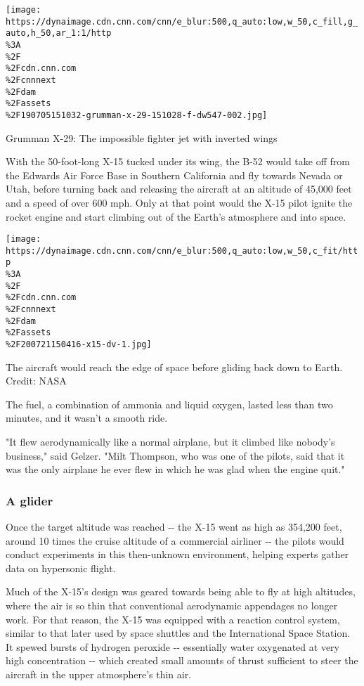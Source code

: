 \texttt{[image: https://dynaimage.cdn.cnn.com/cnn/e\_blur:500,q\_auto:low,w\_50,c\_fill,g\_auto,h\_50,ar\_1:1/http\\\%3A\\\%2F\\\%2Fcdn.cnn.com\\\%2Fcnnnext\\\%2Fdam\\\%2Fassets\\\%2F190705151032-grumman-x-29-151028-f-dw547-002.jpg]}

Grumman X-29: The impossible fighter jet with inverted wings

With the 50-foot-long X-15 tucked under its wing, the B-52 would take
off from the Edwards Air Force Base in Southern California and fly
towards Nevada or Utah, before turning back and releasing the aircraft
at an altitude of 45,000 feet and a speed of over 600 mph. Only at that
point would the X-15 pilot ignite the rocket engine and start climbing
out of the Earth's atmosphere and into space.

\texttt{[image: https://dynaimage.cdn.cnn.com/cnn/e\_blur:500,q\_auto:low,w\_50,c\_fit/http\\\%3A\\\%2F\\\%2Fcdn.cnn.com\\\%2Fcnnnext\\\%2Fdam\\\%2Fassets\\\%2F200721150416-x15-dv-1.jpg]}

The aircraft would reach the edge of space before gliding back down to
Earth. Credit: NASA

The fuel, a combination of ammonia and liquid oxygen, lasted less than
two minutes, and it wasn't a smooth ride.

"It flew aerodynamically like a normal airplane, but it climbed like
nobody's business," said Gelzer. "Milt Thompson, who was one of the
pilots, said that it was the only airplane he ever flew in which he was
glad when the engine quit."

\hypertarget{a-glider}{%
\subsubsection{A glider}\label{a-glider}}

Once the target altitude was reached -\/- the X-15 went as high as
354,200 feet, around 10 times the cruise altitude of a commercial
airliner -\/- the pilots would conduct experiments in this then-unknown
environment, helping experts gather data on hypersonic flight.

Much of the X-15's design was geared towards being able to fly at high
altitudes, where the air is so thin that conventional aerodynamic
appendages no longer work. For that reason, the X-15 was equipped with a
reaction control system, similar to that later used by space shuttles
and the International Space Station. It spewed bursts of hydrogen
peroxide -\/- essentially water oxygenated at very high concentration
-\/- which created small amounts of thrust sufficient to steer the
aircraft in the upper atmosphere's thin air.

